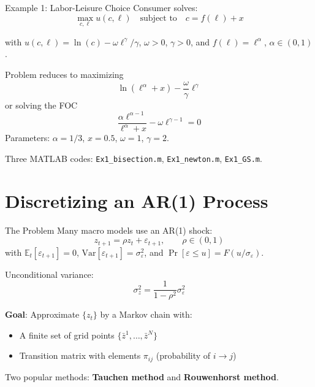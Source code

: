 \documentclass[blue]{beamer}
\newcommand{\E}{\mathbb{E}}
\begin{document}
\begin{frame}{Example 1: Labor-Leisure Choice}
	Consumer solves:
	\[
	\max_{c, \ell} u(c, \ell) \quad \text{subject to} \quad c = f(\ell) + x
	\]
	
	with $u(c, \ell) = \ln(c) - \omega \ell^\gamma/\gamma$, $\omega > 0$, $\gamma > 0$, and $f(\ell) = \ell^\alpha$, $\alpha \in (0, 1)$.
	

	Problem reduces to maximizing
	\[
	\ln(\ell^\alpha + x) - \frac{\omega}{\gamma} \ell^\gamma
	\]
	or solving the FOC
	\[
	\frac{\alpha \ell^{\alpha - 1}}{\ell^\alpha + x} - \omega \ell^{\gamma - 1} = 0
	\]
	Parameters: $\alpha = 1/3$, $x = 0.5$, $\omega = 1$, $\gamma = 2$.
	
	Three MATLAB codes: \texttt{Ex1\_bisection.m}, \texttt{Ex1\_newton.m}, \texttt{Ex1\_GS.m}.
\end{frame}


\section{Discretizing an AR(1) Process}

\begin{frame}{The Problem}
	Many macro models use an AR(1) shock:
	\[
	z_{t+1} = \rho z_t + \varepsilon_{t+1}, \qquad \rho \in (0, 1)
	\]
	with $\E_t[\varepsilon_{t+1}] = 0$, $\text{Var}[\varepsilon_{t+1}] = \sigma_\varepsilon^2$, and $\Pr[\varepsilon \leq u] = F(u/\sigma_\varepsilon)$.
	
	\bigskip
	Unconditional variance:
	\[
	\sigma_z^2 = \frac{1}{1 - \rho^2} \sigma_\varepsilon^2
	\]
	
	\bigskip
	\textbf{Goal}: Approximate $\{z_t\}$ by a Markov chain with:
	\begin{itemize}
		\item A finite set of grid points $\{\bar{z}^1, \ldots, \bar{z}^N\}$
		\item Transition matrix with elements $\pi_{ij}$ (probability of $i \to j$)
	\end{itemize}
	
	\bigskip
	Two popular methods: \textbf{Tauchen method} and \textbf{Rouwenhorst method}.
\end{frame}
\end{document}
